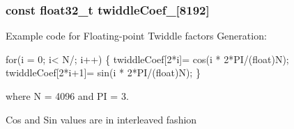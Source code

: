 \subsubsection[{\texorpdfstring{twiddle\+Coef\+\_\+4096}{twiddleCoef_4096}}]{\setlength{\rightskip}{0pt plus 5cm}const float32\+\_\+t twiddle\+Coef\+\_\mbox{[}8192\mbox{]}}\hypertarget{group__CFFT__CIFFT_gae0182d1dd3b2f21aad4e38a815a0bd40}{}\label{group__CFFT__CIFFT_gae0182d1dd3b2f21aad4e38a815a0bd40}
\begin{DoxyParagraph}{}
Example code for Floating-\/point Twiddle factors Generation\+: 
\end{DoxyParagraph}
\begin{DoxyParagraph}{}

\begin{DoxyPre}for(i = 0; i< N/; i++)
\{
  twiddleCoef[2*i]= cos(i * 2*PI/(float)N);
  twiddleCoef[2*i+1]= sin(i * 2*PI/(float)N);
\} \end{DoxyPre}
 
\end{DoxyParagraph}
\begin{DoxyParagraph}{}
where N = 4096 and PI = 3. 
\end{DoxyParagraph}
\begin{DoxyParagraph}{}
Cos and Sin values are in interleaved fashion 
\end{DoxyParagraph}
